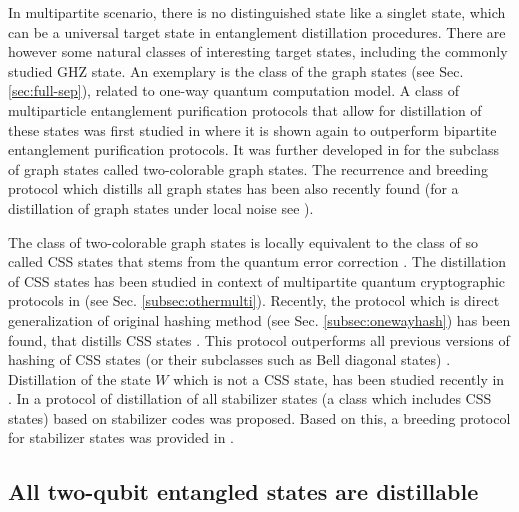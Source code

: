 \documentclass[rmp,12pt,preprint]{revtex4-2}
\begin{document}
In multipartite scenario, there is no distinguished state like a
singlet state, which can be a universal target state in entanglement
distillation procedures. There are however some natural classes of
interesting target states, including the commonly studied GHZ
state. An exemplary is the class of the graph states (see
Sec. \ref{sec:full-sep}), related to one-way quantum computation
model. A class of multiparticle entanglement purification protocols
that allow for distillation of these states was first studied in
\cite{DurAB_graf_distill2003} where it is shown again to outperform
bipartite entanglement purification protocols. It was further
developed in \cite{AschauerDurBriegelGraphDistPRA05} for the subclass
of graph states called two-colorable graph states. The recurrence and
breeding protocol which distills all graph states has been also
recently found \cite{KruszynskaMBD_allgrafdist2006} (for a
distillation of graph states under local noise see
\cite{KayPDB_pur_term_gs2006}).

The class of two-colorable graph states is locally equivalent to the
class of so called CSS states that stems from the quantum error
correction \cite{CS-codes,Steane-codes-prl,Steane-codes-prsl}. The
distillation of CSS states has been studied in context of multipartite
quantum cryptographic protocols in \cite{ChenLo_multi_dist} (see
Sec. \ref{subsec:othermulti}).  Recently,
the protocol which is direct
generalization of original hashing method (see
Sec. \ref{subsec:onewayhash}) has been found, that distills CSS states
\cite{HostenesDM_CSSdist2006}.
This protocol outperforms all previous versions of hashing of CSS states (or their subclasses such as Bell diagonal states)
\cite{ManevaS_multi_hash2002,DurAB_graf_distill2003,ChenLo_multi_dist,AschauerDurBriegelGraphDistPRA05}.
Distillation of the state $W$ which is not a CSS state, has been studied recently
in \cite{MiyakeB_Wdist2005}.
In \cite{GlancyKV2006} a protocol of distillation  of all stabilizer states
(a class which includes CSS states) based on stabilizer codes \cite{GottesmanPhd,Nielsen-Chuang} was proposed.
Based on this, a breeding protocol for stabilizer states was provided in \cite{HostensDM2006}.


\subsection{All two-qubit entangled states are distillable}
\label{subsec:two-qubits-distil}
\end{document}
